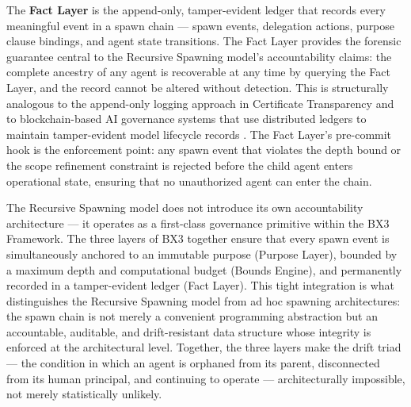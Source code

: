 The \textbf{Fact Layer} is the append-only, tamper-evident ledger that records every meaningful event in a spawn chain — spawn events, delegation actions, purpose clause bindings, and agent state transitions. The Fact Layer provides the forensic guarantee central to the Recursive Spawning model's accountability claims: the complete ancestry of any agent is recoverable at any time by querying the Fact Layer, and the record cannot be altered without detection. This is structurally analogous to the append-only logging approach in Certificate Transparency \cite{laurie2013certificate} and to blockchain-based AI governance systems that use distributed ledgers to maintain tamper-evident model lifecycle records \cite{blockchain_ai_governance}. The Fact Layer's pre-commit hook is the enforcement point: any spawn event that violates the depth bound or the scope refinement constraint is rejected before the child agent enters operational state, ensuring that no unauthorized agent can enter the chain.

The Recursive Spawning model does not introduce its own accountability architecture — it operates as a first-class governance primitive within the BX3 Framework. The three layers of BX3 together ensure that every spawn event is simultaneously anchored to an immutable purpose (Purpose Layer), bounded by a maximum depth and computational budget (Bounds Engine), and permanently recorded in a tamper-evident ledger (Fact Layer). This tight integration is what distinguishes the Recursive Spawning model from ad hoc spawning architectures: the spawn chain is not merely a convenient programming abstraction but an accountable, auditable, and drift-resistant data structure whose integrity is enforced at the architectural level. Together, the three layers make the drift triad — the condition in which an agent is orphaned from its parent, disconnected from its human principal, and continuing to operate — architecturally impossible, not merely statistically unlikely.
